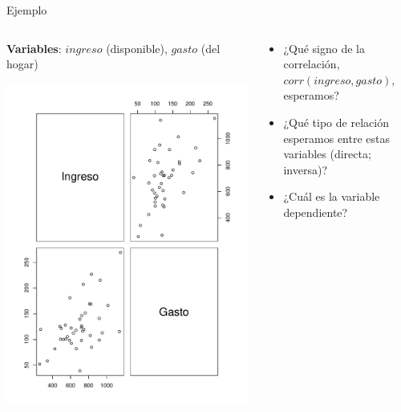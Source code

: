 \documentclass[11pt,handout]{beamer}
\begin{document}
\begin{frame}{Ejemplo}

\begin{columns}[T] %
\begin{column}{.48\textwidth}

\textbf{Variables}: $ingreso$ (disponible), $gasto$ (del hogar)

\begin{center}
	\includegraphics[scale=.3]{fig1.pdf} 
\end{center}


\end{column}%
\hfill%
\begin{column}{.48\textwidth}

\begin{itemize}

	\item ¿Qué signo de la \alert{correlación}, $corr(ingreso, gasto)$, esperamos? 

	\item ¿Qué tipo de relación esperamos entre estas variables (directa; inversa)?

	\item ¿Cuál es la variable \alert{dependiente}?

\end{itemize}

\end{column}%
\end{columns}

\end{frame}
\end{document}
